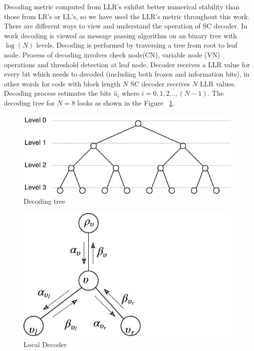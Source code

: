 Decoding metric computed from LLR's exhibit better numerical stability than those from LR's or LL's, so we have used the LLR's metric throughout this work. There are different ways to view and understand the operation of SC decoder. In work decoding is viewed as message passing algorithm on an binary tree with $\log(N)$ levels. Decoding is performed by traversing a tree from root to leaf node. Process of decoding involves check node(CN), variable node (VN) operations and threshold detection at leaf node. Decoder receives a LLR value for every bit which needs to decoded (including both frozen and information bits), in other words for code with block length $N$ SC decoder receives $N$ LLR values. Decoding process estimates the bits $\hat{u}_{i} $  where $i = 0,1,2...,(N-1)$. The decoding tree for $N = 8$ looks as shown in the Figure ~\ref{fig:decodingTree}.

\begin{figure}[h]
	\centering
	\includegraphics{./figures/decodingTree.pdf}
	\caption{Decoding tree}
	\label{fig:decodingTree}
\end{figure}

\begin{figure}[h]
	\centering
	\includegraphics{./figures/messagePassingDiaS.pdf}
	\caption{Local Decoder}
	\label{fig:msgPassingDia}
\end{figure}

